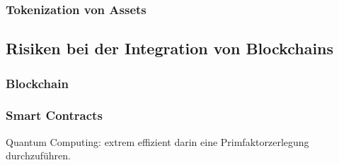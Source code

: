 \subsubsection{Tokenization von Assets}
\label{sec:Tokenization}









\subsection{Risiken bei der Integration von Blockchains}
\cite[p.~17]{pirafelnerblockchaintechnologie}

\subsubsection{Blockchain}

\subsubsection{Smart Contracts}


Quantum Computing:
extrem effizient darin eine Primfaktorzerlegung durchzuführen.

